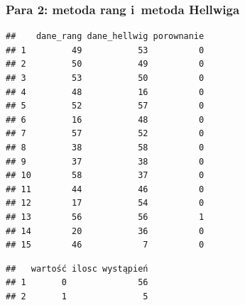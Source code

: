 \documentclass[12pt,a4paper]{report}
\begin{document}
{\subsubsection{Para 2: metoda rang i~metoda
Hellwiga}%
\begin{Shaded}
\begin{Highlighting}[]
\NormalTok{(}\NormalTok{,}\NormalTok{)}
\NormalTok{:}
\NormalTok{\{}
  \NormalTok{\{}
  \NormalTok{\}}
\NormalTok{\}}
\NormalTok{)}
\end{Highlighting}
\end{Shaded}
\begin{verbatim}
##    dane_rang dane_hellwig porownanie
## 1         49           53          0
## 2         50           49          0
## 3         53           50          0
## 4         48           16          0
## 5         52           57          0
## 6         16           48          0
## 7         57           52          0
## 8         38           58          0
## 9         37           38          0
## 10        58           37          0
## 11        44           46          0
## 12        17           54          0
## 13        56           56          1
## 14        20           36          0
## 15        46            7          0
\end{verbatim}
\begin{Shaded}
\begin{Highlighting}[]
\NormalTok{(}
\NormalTok{(}\NormalTok{,}\NormalTok{)}
\end{Highlighting}
\end{Shaded}
\begin{verbatim}
##   wartość ilosc wystąpień
## 1       0              56
## 2       1               5
\end{verbatim}
}
\end{document}
